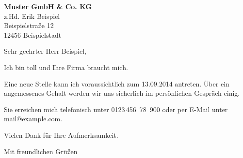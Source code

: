 \documentclass[a4paper, parskip=full*, fromalign=right, fromphone, fromemail]{scrlttr2}
\begin{document}
\pagestyle{plain}
\begin{letter}{\textbf{Muster GmbH & Co. KG}\\z.Hd. Erik Beispiel\\Beispielstraße 12\\12456 Beispielstadt} 
\opening{Sehr geehrter Herr Beispiel,} 
Ich bin toll und Ihre Firma braucht mich.

Eine neue Stelle kann ich voraussichtlich zum 13.09.2014 antreten. Über ein angemessenes Gehalt werden wir uns sicherlich im persönlichen Gespräch einig.

Sie erreichen mich telefonisch unter 0123\,456~78~900 oder per E-Mail unter mail@example.com.

Vielen Dank für Ihre Aufmerksamkeit.

\closing{Mit freundlichen Grüßen}
\end{letter} 
\end{document}
